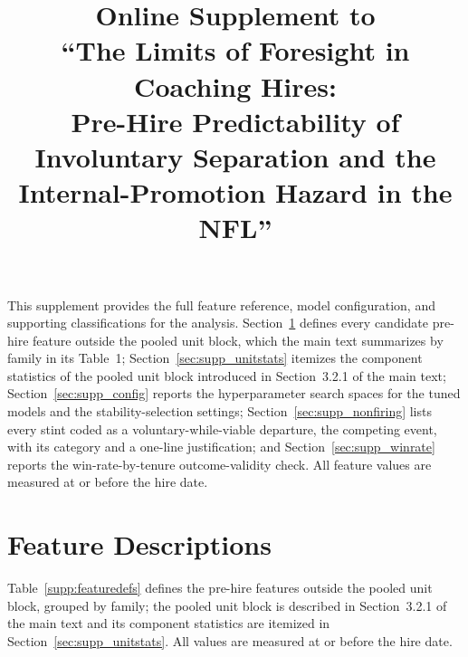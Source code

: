 \documentclass[12pt,USenglish]{article}
\begin{document}
\title{Online Supplement to\\
``The Limits of Foresight in Coaching Hires:\\
Pre-Hire Predictability of Involuntary Separation and the\\
Internal-Promotion Hazard in the NFL''}

\author{}
\date{}
\maketitle

\noindent This supplement provides the full feature reference, model configuration, and
supporting classifications for the analysis. Section~\ref{sec:supp_features} defines every
candidate pre-hire feature outside the pooled unit block, which the main text summarizes by
family in its Table~1; Section~\ref{sec:supp_unitstats} itemizes the component statistics of
the pooled unit block introduced in Section~3.2.1 of the main text;
Section~\ref{sec:supp_config} reports the hyperparameter search spaces for the tuned models
and the stability-selection settings; Section~\ref{sec:supp_nonfiring} lists every stint
coded as a voluntary-while-viable departure, the competing event, with its category and a
one-line justification; and Section~\ref{sec:supp_winrate} reports the win-rate-by-tenure
outcome-validity check. All feature values are measured at or before the hire date.

\section{Feature Descriptions}
\label{sec:supp_features}

Table~\ref{supp:featuredefs} defines the pre-hire features outside the pooled unit
block, grouped by family; the pooled unit block is described in Section~3.2.1 of the
main text and its component statistics are itemized in Section~\ref{sec:supp_unitstats}.
All values are measured at or before the hire date.
\end{document}
